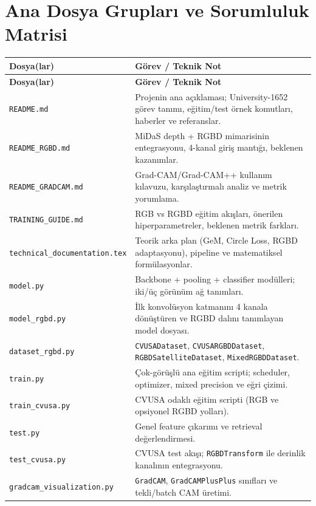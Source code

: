 \documentclass[11pt,a4paper]{article}
\begin{document}
\section{Ana Dosya Grupları ve Sorumluluk Matrisi}
\begin{longtable}{|p{}|p{}|}
\hline
\textbf{Dosya(lar)} & \textbf{Görev / Teknik Not} \\
\hline
\endfirsthead
\hline
\textbf{Dosya(lar)} & \textbf{Görev / Teknik Not} \\
\hline
\endhead

\texttt{README.md} & Projenin ana açıklaması; University-1652 görev tanımı, eğitim/test örnek komutları, haberler ve referanslar. \\
\hline
\texttt{README\_RGBD.md} & MiDaS depth + RGBD mimarisinin entegrasyonu, 4-kanal giriş mantığı, beklenen kazanımlar. \\
\hline
\texttt{README\_GRADCAM.md} & Grad-CAM/Grad-CAM++ kullanım kılavuzu, karşılaştırmalı analiz ve metrik yorumlama. \\
\hline
\texttt{TRAINING\_GUIDE.md} & RGB vs RGBD eğitim akışları, önerilen hiperparametreler, beklenen metrik farkları. \\
\hline
\texttt{technical\_documentation.tex} & Teorik arka plan (GeM, Circle Loss, RGBD adaptasyonu), pipeline ve matematiksel formülasyonlar. \\
\hline
\texttt{model.py} & Backbone + pooling + classifier modülleri; iki/üç görünüm ağ tanımları. \\
\hline
\texttt{model\_rgbd.py} & İlk konvolüsyon katmanını 4 kanala dönüştüren ve RGBD dalını tanımlayan model dosyası. \\
\hline
\texttt{dataset\_rgbd.py} & \texttt{CVUSADataset}, \texttt{CVUSARGBDDataset}, \texttt{RGBDSatelliteDataset}, \texttt{MixedRGBDDataset}. \\
\hline
\texttt{train.py} & Çok-görüşlü ana eğitim scripti; scheduler, optimizer, mixed precision ve eğri çizimi. \\
\hline
\texttt{train\_cvusa.py} & CVUSA odaklı eğitim scripti (RGB ve opsiyonel RGBD yolları). \\
\hline
\texttt{test.py} & Genel feature çıkarımı ve retrieval değerlendirmesi. \\
\hline
\texttt{test\_cvusa.py} & CVUSA test akışı; \texttt{RGBDTransform} ile derinlik kanalının entegrasyonu. \\
\hline
\texttt{gradcam\_visualization.py} & \texttt{GradCAM}, \texttt{GradCAMPlusPlus} sınıfları ve tekli/batch CAM üretimi. \\

\end{longtable}
\end{document}
